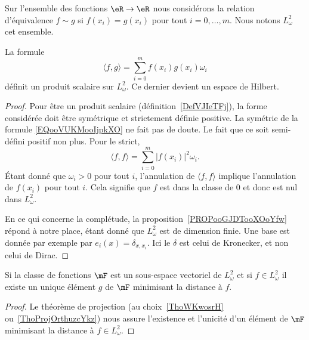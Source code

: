 Sur l'ensemble des fonctions \( \eR\to\eR\) nous considérons la relation d'équivalence \( f\sim g\) si \( f(x_i)=g(x_i)\) pour tout \( i=0,\ldots, m\). Nous notons \(  L^2_{\omega}  \) cet ensemble.

\begin{proposition}
	La formule
	\begin{equation}        \label{EQooVUKMooIjpkXO}
		\langle f, g\rangle =\sum_{i=0}^mf(x_i)g(x_i)\omega_i
	\end{equation}
	définit un produit scalaire sur \( L^2_{\omega}\). Ce dernier devient un espace de Hilbert.
\end{proposition}

\begin{proof}
	Pour être un produit scalaire (définition~\ref{DefVJIeTFj}), la forme considérée doit être symétrique et strictement définie positive. La symétrie de la formule \eqref{EQooVUKMooIjpkXO} ne fait pas de doute. Le fait que ce soit semi-défini positif non plus. Pour le strict,
	\begin{equation}
		\langle f, f\rangle =\sum_{i=0}^m| f(x_i) |^2\omega_i.
	\end{equation}
	Étant donné que \( \omega_i>0\) pour tout \( i\), l'annulation de \( \langle f, f\rangle \) implique l'annulation de \( f(x_i)\) pour tout \( i\). Cela signifie que \( f\) est dans la classe de \( 0\) et donc est nul dans \( L^2_{\omega}\).

	En ce qui concerne la complétude, la proposition~\ref{PROPooGJDTooXOoYfw} répond à notre place, étant donné que \( L^2_{\omega}\) est de dimension finie. Une base est donnée par exemple par \( e_i(x)=\delta_{x,x_{i}}\). Ici le \( \delta\) est celui de Kronecker, et non celui de Dirac.
\end{proof}

\begin{lemma}
	Si la classe de fonctions \( \mF\) est un sous-espace vectoriel de \( L^2_{\omega}\) et si \( f\in L^2_{\omega}\) il existe un unique élément \( g\) de \( \mF\) minimisant la distance à \( f\).
\end{lemma}

\begin{proof}
	Le théorème de projection (au choix~\ref{ThoWKwosrH} ou~\ref{ThoProjOrthuzcYkz}) nous assure l'existence et l'unicité d'un élément de \( \mF\) minimisant la distance à \( f\in L^2_{\omega}\).
\end{proof}

